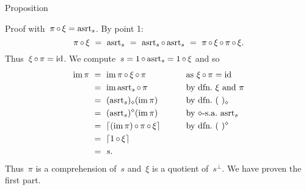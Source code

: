 \documentclass[b]{subfiles}
\begin{document}
\begin{parsec}
\begin{point}{Proposition}
\begin{point}{Proof}
    with~$\pi \mathop{\circ} \xi = \mathrm{asrt}_s$.
By point 1:
\begin{equation*}
   \pi \mathop{\circ} \xi \ =\  \mathrm{asrt}_s \ =\  \mathrm{asrt}_s\mathop{\circ}\mathrm{asrt}_s \ =\  \pi \mathop{\circ} \xi \mathop{\circ} \pi \mathop{\circ} \xi.
\end{equation*}
Thus~$\xi \mathop{\circ} \pi = \operatorname{id}$.
We compute~$s = 1 \mathop{\circ} \mathrm{asrt}_s = 1 \mathop{\circ} \xi$
and so
\begin{alignat*}{2}
    \IM \pi &\ = \ 
    \IM \pi \after \xi \after \pi &\qquad& \text{as $\xi \after \pi=\id$}\\
                  &\ = \ \IM \asrt_s \after \pi &&\text{by dfn.~$\xi$ and~$\pi$}\\
                  &\ = \ (\asrt_s)_{\diamond}(\IM \pi)&& \text{by dfn.~$(\ )_\diamond$} \\
                  & \ = \ (\asrt_s)^{\diamond}(\IM \pi)&&
        \text{by $\diamond$-s.a.~$\asrt_s$}\\
        &\ = \ \ceil{(\IM \pi) \after \pi \after \xi} && \text{by dfn.~$(\ )^\diamond$} \\
&\ = \ \ceil{1 \after \xi} \\
    & \ = \ s.
\end{alignat*}
Thus~$\pi$ is a comprehension of~$s$
and~$\xi$ is a quotient of~$s^\perp$.
We have proven the first part.


\end{point}
\end{point}
\end{parsec}
\end{document}
